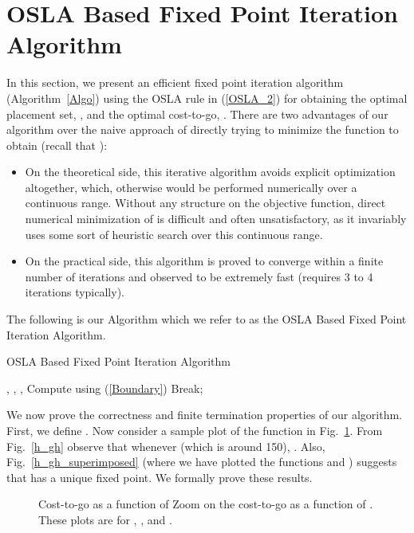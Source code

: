 \documentclass[conference]{IEEEtran}
\begin{document}
\section{OSLA Based Fixed Point Iteration Algorithm} 
\label{FPI_NLOS_section}
In this section, we present an efficient fixed point iteration
algorithm (Algorithm~\ref{Algo}) using the OSLA rule in (\ref{OSLA_2})
for obtaining the optimal placement set, , and
the optimal cost-to-go, . There are two advantages of
our algorithm over the naive approach of directly trying to minimize
the function  to obtain  (recall that
):
\begin{itemize}
\item On the theoretical side, this iterative algorithm avoids
  explicit optimization altogether, which, otherwise would be
  performed numerically over a continuous range. Without any structure
  on the objective function, direct numerical minimization of
   is difficult and often unsatisfactory, as it  invariably
  uses some sort of heuristic search over this continuous range.
\item On the practical side, this algorithm is proved to converge
  within a finite number of iterations and observed to be extremely
  fast (requires 3 to 4 iterations typically). 
\end{itemize}  

The following is our Algorithm which we refer to as the 
OSLA Based Fixed Point Iteration Algorithm.
\begin{algorithm} 
\caption{OSLA Based Fixed Point Iteration Algorithm}
\begin{algorithmic}[1] 
\REQUIRE , , 
\STATE , 
\STATE 
\STATE Compute  using (\ref{Boundary})
\IF{} \STATE Break; \ENDIF
\STATE 
\STATE  
\ENDWHILE
{}
\end{algorithmic}
\label{Algo}
\end{algorithm}


We now prove the correctness and finite termination properties of our
algorithm.  First, we define .  Now consider a sample plot of the function  in
Fig.~\ref{func_g_figure}.  From Fig.~\ref{h_gh} observe that whenever
 (which is around 150), . Also,
Fig.~\ref{h_gh_superimposed} (where we have plotted the functions
 and ) suggests that  has a unique fixed point. We
formally prove these results.




\begin{figure}[h]
\centering
{}
\caption{ Cost-to-go  as a function of    Zoom on the cost-to-go  as a function of .
These plots are for , , and .\label{func_g_figure}
}
\end{figure}
 
\end{document}
